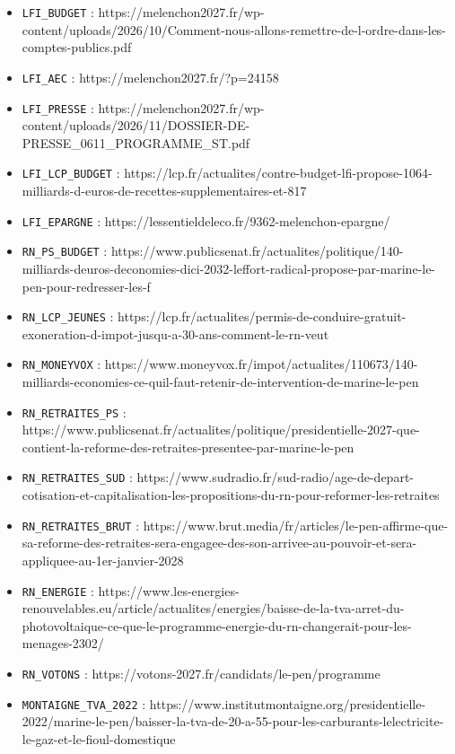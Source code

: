 \documentclass[
  11pt,
  11pt,
  a4paper,
  openany]{book}
\providecommand{\tightlist}{%
  \setlength{\itemsep}{0pt}\setlength{\parskip}{0pt}}
\begin{document}
\begin{itemize}
\tightlist
\item
  \texttt{LFI\_BUDGET} :
  https://melenchon2027.fr/wp-content/uploads/2026/10/Comment-nous-allons-remettre-de-l-ordre-dans-les-comptes-publics.pdf
\item
  \texttt{LFI\_AEC} : https://melenchon2027.fr/?p=24158
\item
  \texttt{LFI\_PRESSE} :
  https://melenchon2027.fr/wp-content/uploads/2026/11/DOSSIER-DE-PRESSE\_0611\_PROGRAMME\_ST.pdf
\item
  \texttt{LFI\_LCP\_BUDGET} :
  https://lcp.fr/actualites/contre-budget-lfi-propose-1064-milliards-d-euros-de-recettes-supplementaires-et-817
\item
  \texttt{LFI\_EPARGNE} :
  https://lessentieldeleco.fr/9362-melenchon-epargne/
\item
  \texttt{RN\_PS\_BUDGET} :
  https://www.publicsenat.fr/actualites/politique/140-milliards-deuros-deconomies-dici-2032-leffort-radical-propose-par-marine-le-pen-pour-redresser-les-f
\item
  \texttt{RN\_LCP\_JEUNES} :
  https://lcp.fr/actualites/permis-de-conduire-gratuit-exoneration-d-impot-jusqu-a-30-ans-comment-le-rn-veut
\item
  \texttt{RN\_MONEYVOX} :
  https://www.moneyvox.fr/impot/actualites/110673/140-milliards-economies-ce-quil-faut-retenir-de-intervention-de-marine-le-pen
\item
  \texttt{RN\_RETRAITES\_PS} :
  https://www.publicsenat.fr/actualites/politique/presidentielle-2027-que-contient-la-reforme-des-retraites-presentee-par-marine-le-pen
\item
  \texttt{RN\_RETRAITES\_SUD} :
  https://www.sudradio.fr/sud-radio/age-de-depart-cotisation-et-capitalisation-les-propositions-du-rn-pour-reformer-les-retraites
\item
  \texttt{RN\_RETRAITES\_BRUT} :
  https://www.brut.media/fr/articles/le-pen-affirme-que-sa-reforme-des-retraites-sera-engagee-des-son-arrivee-au-pouvoir-et-sera-appliquee-au-1er-janvier-2028
\item
  \texttt{RN\_ENERGIE} :
  https://www.les-energies-renouvelables.eu/article/actualites/energies/baisse-de-la-tva-arret-du-photovoltaique-ce-que-le-programme-energie-du-rn-changerait-pour-les-menages-2302/
\item
  \texttt{RN\_VOTONS} :
  https://votons-2027.fr/candidats/le-pen/programme
\item
  \texttt{MONTAIGNE\_TVA\_2022} :
  https://www.institutmontaigne.org/presidentielle-2022/marine-le-pen/baisser-la-tva-de-20-a-55-pour-les-carburants-lelectricite-le-gaz-et-le-fioul-domestique

\end{itemize}
\end{document}
